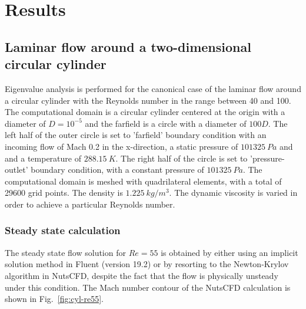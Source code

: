 \documentclass[journal,final]{new-aiaa}
\begin{document}
\section{Results}
\label{label:results}

\subsection{Laminar flow around a two-dimensional circular cylinder}
Eigenvalue analysis is performed for the canonical case of the
laminar flow around a circular cylinder with the Reynolds number in
the range between 40 and 100. The computational domain is a
circular cylinder centered at the origin with a diameter of $D=10^{-5}$
and the farfield is a circle with a diameter of $100D$. The left half of
the outer circle is set to 'farfield' boundary condition with an incoming
flow of Mach 0.2 in the x-direction, a static pressure of $101325~Pa$ and
and a temperature of $288.15~K$.
The right half of the circle is set to 'pressure-outlet' boundary condition,
with a constant pressure of $101325~Pa$.
The computational domain is meshed with quadrilateral elements,
with a total of 29600 grid points. The density is $1.225~kg/m^3$.
The dynamic viscosity is varied in order to achieve a particular Reynolds number.

\subsubsection{Steady state calculation}
The steady state flow solution for $Re=55$ is obtained by either using an implicit solution method in
Fluent (version 19.2) or by resorting to the Newton-Krylov algorithm in NutsCFD,
despite the fact that the flow is physically unsteady under this condition. The
Mach number contour of the NutsCFD calculation is shown in Fig.~\ref{fig:cyl-re55}.
%
\end{document}
